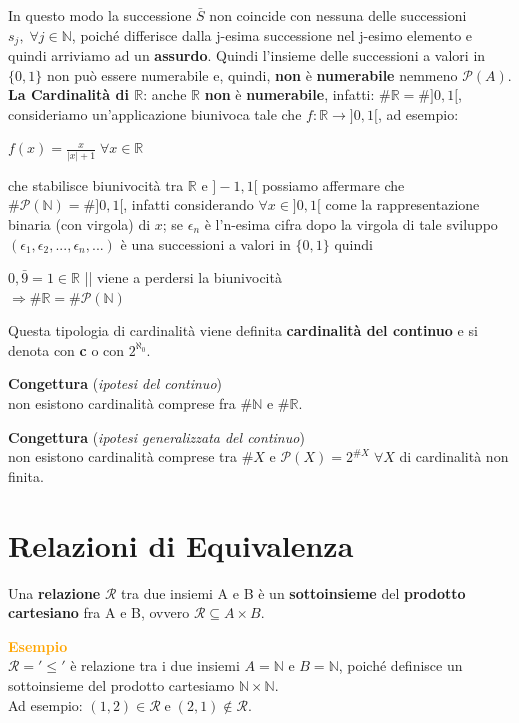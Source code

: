 \newpage
In questo modo la successione $\bar{S}$ non coincide con nessuna delle successioni $s_j, \; \forall j \in \mathbb{N}$, poiché differisce dalla j-esima successione nel j-esimo elemento e quindi arriviamo ad un \textbf{assurdo}.
Quindi l'insieme delle successioni a valori in $\{0, 1\}$  non può essere numerabile e, quindi, \textbf{non} è \textbf{numerabile} nemmeno $\mathcal{P}(A)$. \\ \newline
\textbf{La Cardinalità di $\mathbb{R}$}: anche $\mathbb{R}$ \textbf{non} è \textbf{numerabile}, infatti: $\#\mathbb{R} = \# ]0,1[$, consideriamo un'applicazione biunivoca tale che $f : \mathbb{R} \rightarrow ]0,1[$, ad esempio:
\begin{center}
    $f(x) = \frac{x}{ |x| + 1 } \; \forall x \in \mathbb{R}$
\end{center}
che stabilisce biunivocità tra $\mathbb{R}$ e $] -1, 1[$ possiamo affermare che $\#\mathcal{P}(\mathbb{N}) = \#]0,1[$, infatti considerando $\forall x \in ]0, 1[$ come la rappresentazione binaria (con virgola) di $x$; se $\epsilon_n$ è l'n-esima cifra dopo la virgola di tale sviluppo $(\epsilon_1, \epsilon_2, ..., \epsilon_n, ...)$ è una successioni a valori in $\{0, 1\}$ quindi
\begin{center}
    $0,\bar{9} = 1 \in \mathbb{R}$ || viene a perdersi la biunivocità \\
    $\Rightarrow \#\mathbb{R} = \# \mathcal{P}(\mathbb{N})$
\end{center}
Questa tipologia di cardinalità viene definita \textbf{cardinalità del continuo} e si denota con \textbf{c} o con $2^{\aleph_0}$.
\begin{boxA}
    \centering
    \textbf{Congettura} (\textit{ipotesi del continuo}) \\ 
    non esistono cardinalità comprese fra $\#\mathbb{N}$ e $\#\mathbb{R} $.
\end{boxA}
\begin{boxA}
    \centering
    \textbf{Congettura} (\textit{ipotesi generalizzata del continuo}) \\
    non esistono cardinalità comprese tra $\#X$ e $\mathcal{P}(X) = 2^{\#X} \; \forall X$ di cardinalità non finita.
\end{boxA}

\section{Relazioni di Equivalenza}
Una \textbf{relazione} $\mathcal{R}$ tra due insiemi A e B è un \textbf{sottoinsieme} del \textbf{prodotto cartesiano} fra A e B, ovvero $\mathcal{R} \subseteq A \times B$.
\begin{boxA}
    \textcolor{orange}{\textbf{Esempio}} \\
    $\mathcal{R} = '\leq'$ è relazione tra i due insiemi $A = \mathbb{N}$ e $B = \mathbb{N}$, poiché definisce un sottoinsieme del prodotto cartesiamo $\mathbb{N} \times \mathbb{N}$. \\
    Ad esempio: $(1, 2) \in \mathcal{R} \; \text{e} \; (2, 1) \notin \mathcal{R}$.
\end{boxA}

